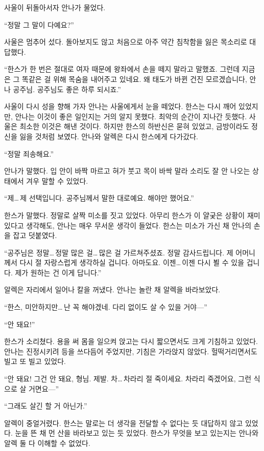 사울이 뒤돌아서자 안나가 물었다.

``정말 그 말이 다예요?''

사울은 멈추어 섰다. 돌아보지도 않고 처음으로 아주 약간 침착함을 잃은 목소리로 대답했다.

``한스가 한 번은 절대로 여자 때문에 왕좌에서 손을 떼지 말라고 말했죠. 그런데 지금은 그 똑같은 걸 위해 목숨을 내어주고 있네요. 왜 태도가 바뀐 건진 모르겠습니다, 안나 공주님. 공주님도 좋은 하루 되시죠.''

사울이 다시 성을 향해 가자 안나는 사울에게서 눈을 떼었다. 한스는 다시 깨어 있었지만, 안나는 이것이 좋은 일인지는 거의 알지 못했다. 최악의 순간이 지나간 듯했다. 사울은 최소한 이것은 해낸 것이다. 하지만 한스의 하반신은 묻혀 있었고, 금방이라도 정신을 잃을 것처럼 보였다. 안나와 알렉은 다시 한스에게 다가갔다.

``정말 죄송해요.''

안나가 말했다. 입 안이 바짝 마르고 혀가 붓고 목이 바싹 말라 소리도 잘 안 나오는 상태에서 겨우 말할 수 있었다.

``제\ldots\,제 선택입니다. 공주님께서 말한 대로예요. 해야만 했어요.''

한스가 말했다. 정말로 살짝 미소를 짓고 있었다. 아무리 한스가 이 얄궂은 상황이 재미있다고 생각해도, 안나는 매우 무서운 생각이 들었다. 한스는 미소가 가신 채 안나의 손을 잡고 덧붙였다.

``공주님은 정말\ldots\,정말 많은 걸\ldots\,많은 걸 가르쳐주셨죠. 정말 감사드립니다. 제 어머니께서 다시 절 자랑스럽게 생각하실 겁니다. 아마도요. 이젠\ldots\,이젠 다시 뵐 수 있을 겁니다. 제가 원하는 건 이게 답니다.''

알렉은 자리에서 일어나 칼을 꺼냈다. 안나는 놀란 채 알렉을 바라보았다.

``한스, 미안하지만\ldots\,난 꼭 해야겠네. 다리 없이도 살 수 있을 거야—''

``안 돼요!''

한스가 소리쳤다. 용을 써 몸을 일으켜 앉고는 다시 짧으면서도 크게 기침하고 있었다. 안나는 진정시키려 등을 쓰다듬어 주었지만, 기침은 가라앉지 않았다. 헐떡거리면서도 빌고 또 빌고 있었다.

``안 돼요! 그건 안 돼요, 형님. 제발. 차\ldots\,차라리 절 죽이세요. 차라리 죽겠어요, 그런 식으로 살 거면요—''

``그래도 살긴 할 거 아닌가.''

알렉이 중얼거렸다. 한스는 말로는 더 생각을 전달할 수 없다는 듯 대답하지 않고 있었다. 눈을 뜬 채 먼 산을 바라보고 있는 듯 있었다. 한스가 무엇을 보고 있는지는 안나와 알렉 둘 다 이해할 수 없었다.


